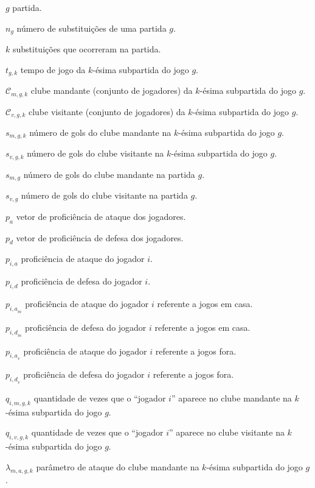 \begin{simbolos}
    \item[$g$] partida.
    \item[$n_g$] número de substituições de uma partida $g$.
    \item[$k$] substituições que ocorreram na partida.
    \item[$t_{g, k}$] tempo de jogo da $k$-ésima subpartida do jogo $g$.
    \item[$\mathcal{C}_{m, g, k}$] clube mandante (conjunto de jogadores) da $k$-ésima subpartida do jogo $g$.
    \item[$\mathcal{C}_{v, g, k}$] clube visitante (conjunto de jogadores) da $k$-ésima subpartida do jogo $g$.
    \item[$s_{m, g, k}$] número de gols do clube mandante na $k$-ésima subpartida do jogo $g$.
    \item[$s_{v, g, k}$] número de gols do clube visitante na $k$-ésima subpartida do jogo $g$.
    \item[$s_{m, g}$] número de gols do clube mandante na partida $g$.
    \item[$s_{v, g}$] número de gols do clube visitante na partida $g$.
    \item[$p_a$] vetor de proficiência de ataque dos jogadores.
    \item[$p_d$] vetor de proficiência de defesa dos jogadores.
    \item[$p_{i, a}$] proficiência de ataque do jogador $i$.
    \item[$p_{i, d}$] proficiência de defesa do jogador $i$.
    \item[$p_{{i, a}_m}$] proficiência de ataque do jogador $i$ referente a jogos em casa.
    \item[$p_{{i, d}_m}$] proficiência de defesa do jogador $i$ referente a jogos em casa.
    \item[$p_{{i, a}_v}$] proficiência de ataque do jogador $i$ referente a jogos fora.
    \item[$p_{{i, d}_v}$] proficiência de defesa do jogador $i$ referente a jogos fora.
    \item[$q_{i, m, g, k}$] quantidade de vezes que o ``jogador $i$'' aparece no clube mandante na $k$-ésima subpartida do jogo $g$.
    \item[$q_{i, v, g, k}$] quantidade de vezes que o ``jogador $i$'' aparece no clube visitante na $k$-ésima subpartida do jogo $g$.
    \item[$\lambda_{m, a, g, k}$] parâmetro de ataque do clube mandante na $k$-ésima subpartida do jogo $g$.

\end{simbolos}
